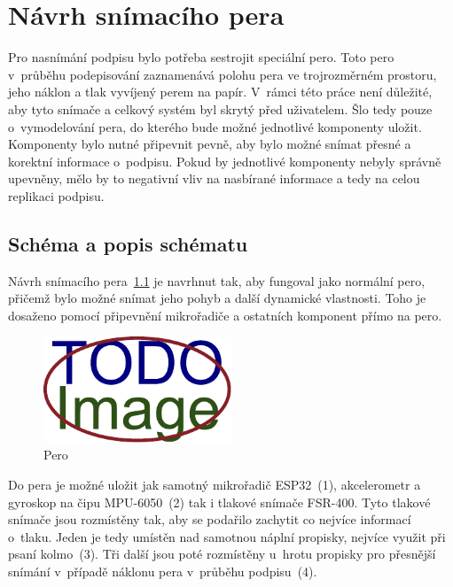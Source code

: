 \chapter{Návrh snímacího pera}
Pro nasnímání podpisu bylo potřeba sestrojit speciální pero.                                        %
Toto pero v~průběhu podepisování zaznamenává polohu pera ve trojrozměrném prostoru,                 %
jeho náklon a tlak vyvíjený perem na papír.                                                         %
V~rámci této práce není důležité, aby tyto snímače a celkový systém byl skrytý před uživatelem.     %
Šlo tedy pouze o~vymodelování pera, do kterého bude možné jednotlivé komponenty uložit.             %
Komponenty bylo nutné připevnit pevně, aby bylo možné snímat přesné a korektní informace o~podpisu. %
Pokud by jednotlivé komponenty nebyly správně upevněny,                                             %
mělo by to negativní vliv na nasbírané informace a tedy na celou replikaci podpisu.                 %
 
\section{Schéma a popis schématu}
Návrh snímacího pera~\ref{fig:pero} je navrhnut tak, aby fungoval jako normální pero, 
přičemž bylo možné snímat jeho pohyb a další dynamické vlastnosti.
Toho je dosaženo pomocí připevnění mikrořadiče a ostatních komponent přímo na pero.

\begin{figure}[h]
  \centering
  \includegraphics[width=0.5\textwidth]{obrazky-figures/placeholder.pdf}
  \caption{Pero} 
  \label{fig:pero}
\end{figure}

Do pera je možné uložit jak samotný mikrořadič ESP32~(1), akcelerometr a gyroskop na čipu MPU-6050~(2) tak i tlakové snímače FSR-400.
Tyto tlakové snímače jsou rozmístěny tak, aby se podařilo zachytit co nejvíce informací o~tlaku.
Jeden je tedy umístěn nad samotnou náplní propisky, nejvíce využit při psaní kolmo~(3).
Tři další jsou poté rozmístěny u~hrotu propisky pro přesnější snímání v~případě náklonu pera v~průběhu podpisu~(4). 


